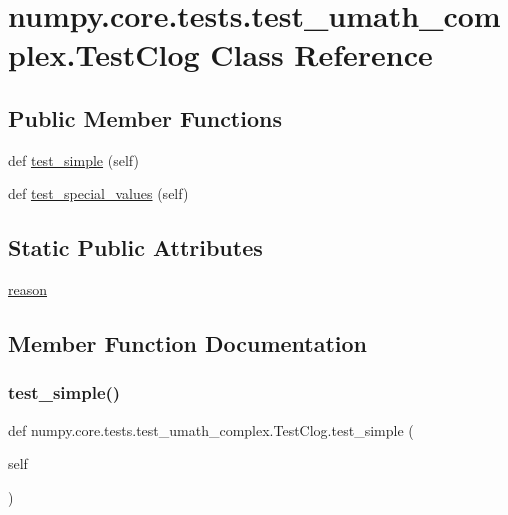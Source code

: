 \hypertarget{classnumpy_1_1core_1_1tests_1_1test__umath__complex_1_1TestClog}{}\section{numpy.\+core.\+tests.\+test\+\_\+umath\+\_\+complex.\+Test\+Clog Class Reference}
\label{classnumpy_1_1core_1_1tests_1_1test__umath__complex_1_1TestClog}
\subsection*{Public Member Functions}
\begin{DoxyCompactItemize}
\item 
def \hyperlink{classnumpy_1_1core_1_1tests_1_1test__umath__complex_1_1TestClog_a4156d9af30eed85db12298e929113280}{test\+\_\+simple} (self)
\item 
def \hyperlink{classnumpy_1_1core_1_1tests_1_1test__umath__complex_1_1TestClog_a684d8bb8d122db6b7ef1f1eb89207d3b}{test\+\_\+special\+\_\+values} (self)
\end{DoxyCompactItemize}
\subsection*{Static Public Attributes}
\begin{DoxyCompactItemize}
\item 
\hyperlink{classnumpy_1_1core_1_1tests_1_1test__umath__complex_1_1TestClog_acbcad070c8c6895ea428a745778043b8}{reason}
\end{DoxyCompactItemize}


\subsection{Member Function Documentation}
\mbox{\label{classnumpy_1_1core_1_1tests_1_1test__umath__complex_1_1TestClog_a4156d9af30eed85db12298e929113280}} 
\subsubsection{\texorpdfstring{test\+\_\+simple()}{test\_simple()}}
{\footnotesize\ttfamily def numpy.\+core.\+tests.\+test\+\_\+umath\+\_\+complex.\+Test\+Clog.\+test\+\_\+simple (\begin{DoxyParamCaption}\item[{}]{self }\end{DoxyParamCaption})}

